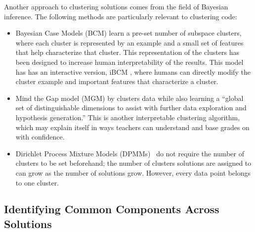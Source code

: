 Another approach to clustering solutions comes from the field of Bayesian inference. The following methods are particularly relevant to clustering code:
\begin{itemize}
\item Bayesian Case Models (BCM) \citet{beenNIPS} learn a pre-set number of subspace clusters, where each cluster is represented by an example and a small set of features that help characterize that cluster. This representation of the clusters has been designed to increase human interpretability of the results. This model has has an interactive version, iBCM \cite{beenthesis}, where humans can directly modify the cluster example and important features that characterize a cluster.
\item Mind the Gap model (MGM) by \citet{kim2015mind} clusters data while also learning a ``global set of distinguishable dimensions to assist with further data exploration and hypothesis generation.'' This is another interpretable clustering algorithm, which may explain itself in ways teachers can understand and base grades on with confidence.
\item Dirichlet Process Mixture Models (DPMMs)~\cite{} do not require the number of clusters to be set beforehand; the number of clusters solutions are assigned to can grow as the number of solutions grow. However, every data point belongs to one cluster.
\end{itemize}







\subsection{Identifying Common Components Across Solutions}

